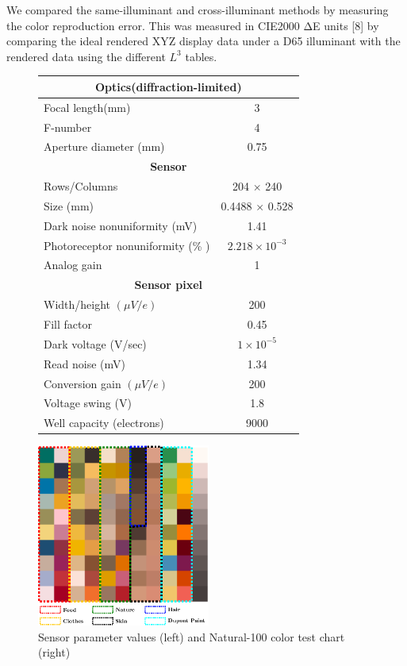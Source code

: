 \documentclass[]{spie}
\begin{document}
We compared the same-illuminant and cross-illuminant methods by measuring the color reproduction error.  This was measured in CIE2000 ΔΕ units [8] by comparing the ideal rendered XYZ display data under a D65 illuminant with the rendered data using the different $L^3$ tables.

\begin{figure}
 \begin{center}
\begin{minipage}{0.45\textwidth}
\begin{flushright}
 \begin{scriptsize}
\begin{tabular}{|l|c|}
\hline 
\multicolumn{2}{|c|}{\textbf{Optics(diffraction-limited)}} \\\hline 
Focal length(mm) & 3 \\  
F-number & 4 \\  
Aperture diameter (mm) & 0.75 \\ \hline 
\multicolumn{2}{|c|}{\textbf{Sensor}} \\ \hline 
Rows/Columns & 204 $\times$ 240 \\  
Size (mm) & 0.4488 $\times$ 0.528 \\  
Dark noise nonuniformity (mV) & 1.41 \\  
Photoreceptor nonuniformity (\% ) & $2.218 \times 10 ^{-3}$ \\  
Analog gain & 1 \\\hline 
\multicolumn{2}{|c|}{\textbf{Sensor pixel }} \\ \hline 
Width/height $(\mu V/e)$ & 200 \\  
Fill factor & 0.45  \\
Dark voltage (V/sec) & $1 \times 10^{-5}$ \\  
Read noise (mV) & 1.34 \\  
Conversion gain $(\mu V/e)$ & 200 \\  
Voltage swing (V) & 1.8 \\  
Well capacity (electrons) & 9000 \\ \hline 
\end{tabular} 
\end{scriptsize}
\end{flushright}
\end{minipage}\hfill
\begin{minipage}{0.45\textwidth}
\begin{flushleft}
 \includegraphics[height=6cm]{natureBasedChart}
\end{flushleft}
\end{minipage}
\caption{Sensor parameter values (left) and Natural-100 color test chart (right)}


\end{center}
\end{figure}
\end{document}

